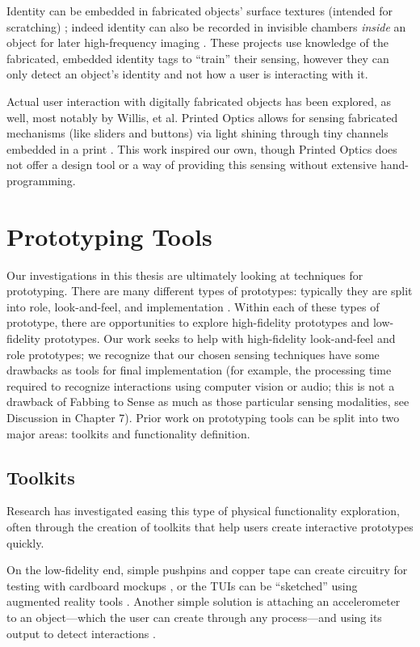         Identity can be embedded in fabricated objects' surface textures (intended for scratching) \cite{harrison-acoustic}; indeed identity can also be recorded in invisible chambers \emph{inside} an object for later high-frequency imaging \cite{willis-infrastructs}. These projects use knowledge of the fabricated, embedded identity tags to ``train'' their sensing, however they can only detect an object's identity and not how a user is interacting with it.

        Actual user interaction with digitally fabricated objects has been explored, as well, most notably by Willis, et al. Printed Optics allows for sensing fabricated mechanisms (like sliders and buttons) via light shining through tiny channels embedded in a print \cite{willis-printedoptics}. This work inspired our own, though Printed Optics does not offer a design tool or a way of providing this sensing without extensive hand-programming.

\section{Prototyping Tools}

    Our investigations in this thesis are ultimately looking at techniques for prototyping. There are many different types of prototypes: typically they are split into role, look-and-feel, and implementation \cite{houde-prototypes}. Within each of these types of prototype, there are opportunities to explore high-fidelity prototypes and low-fidelity prototypes. Our work seeks to help with high-fidelity look-and-feel and role prototypes; we recognize that our chosen sensing techniques have some drawbacks as tools for final implementation (for example, the processing time required to recognize interactions using computer vision or audio; this is not a drawback of Fabbing to Sense as much as those particular sensing modalities, see Discussion in Chapter 7). Prior work on prototyping tools can be split into two major areas: toolkits and functionality definition.

    \subsection{Toolkits}
    Research has investigated easing this type of physical functionality exploration, often through the creation of toolkits that help users create interactive prototypes quickly.
    
    On the low-fidelity end, simple pushpins and copper tape can create circuitry for testing with cardboard mockups \cite{hudson-boxes}, or the TUIs can be ``sketched'' using augmented reality tools \cite{nam-sketchingtuis}. Another simple solution is attaching an accelerometer to an object---which the user can create through any process---and using its output to detect interactions \cite{hook-making}.
    
